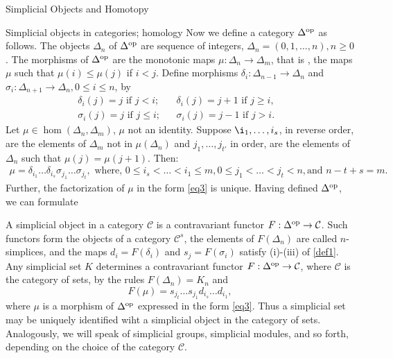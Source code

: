 \documentclass[a4,20pt,twosides]{book}
\begin{document}
\begin{chapter}{Simplicial Objects and Homotopy}
\begin{section}{Simplicial objects in categories; homology}
	Now we define a category $\Delta^{\text{op}}$ as follows. The objects $\Delta_{n}$ of $\Delta^{\text{op}}$ are sequence of integers, $\Delta_{n} = (0,1,\dots,n), n \geq 0$. The morphisms of $\Delta^{\text{op}}$ are the monotonic maps $\mu: \Delta_n \rightarrow \Delta_m $, that is , the maps $\mu$ such that $\mu(i) \leq \mu(j)$ if $i<j$. Define morphisms $\delta_i : \Delta_{n-1} \rightarrow \Delta_{n}$ and $\sigma_i : \Delta_{n+1} \rightarrow \Delta_{n}, 0 \leq i \leq n$, by
	\begin{align}
		\delta_i (j) = j \text{ if } j <i; & & \delta_i(j)=j+1 \text{ if } j \geq i,&\\
		\sigma_i(j) = j \text{ if } j \leq i; & & \sigma_i(j)= j-1 \text{ if } j >i.
	\end{align}
	Let $\mu \in \hom(\Delta_n , \Delta_m)$, $\mu$ not an identity. Suppose $\i_1, \dots , i_s$, in reverse order, are the elements of $\Delta_m$ not in $\mu(\Delta_n)$ and $j_1,\dots,j_{t'}$ in order, are the elements of $\Delta_n$ such that $\mu(j) = \mu(j+1)$. Then:
	\begin{align}
	\label{eq3}
		\mu = \delta_{i_1} \dots \delta_{i_s} \sigma_{j_1} \dots \sigma_{j_t},\text{ where, } 0 \leq i_s < \dots < i_1 \leq m, 0 \leq j_1 < \dots < j_t < n,\text{and }n-t+s=m.
	\end{align}
	Further, the factorization of $\mu$ in the form \ref{eq3} is unique. Having defined $\Delta^{\text{op}}$, we can formulate
	\begin{chdefn}
		A simplicial object in a category $\mathcal{C}$ is a contravariant functor $F: \Delta^{\text{op}} \rightarrow \mathcal{C}$. Such functors form the objects of a category $\mathcal{C}^{s}$, the elements of $F(\Delta_n)$ are called $n$-simplices, and the maps $d_i= F(\delta_i)$ and $s_j = F(\sigma_i)$ satisfy (i)-(iii) of \ref{def1}. Any simplicial set $K$ determines a contravariant functor $F: \Delta^{\text{op}} \rightarrow \mathcal{C}$, where $\mathcal{C}$ is the category of sets, by the rules $F(\Delta_n)= K_n$ and 
		\[
		F(\mu) = s_{j_t} \dots s_{j_1} d_{i_s} \dots d_{i_1},
		\]
		where $\mu$ is a morphism of $\Delta^{\text{op}}$ expressed in the form \ref{eq3}. Thus a simplicial set may be uniquely identified wiht a simplicial object in the category of sets. Analogously, we will speak of simplicial groups, simplicial modules, and so forth, depending on the choice of the category $\mathcal{C}$.
	\end{chdefn}
	

\end{section}
\end{chapter}
\end{document}
